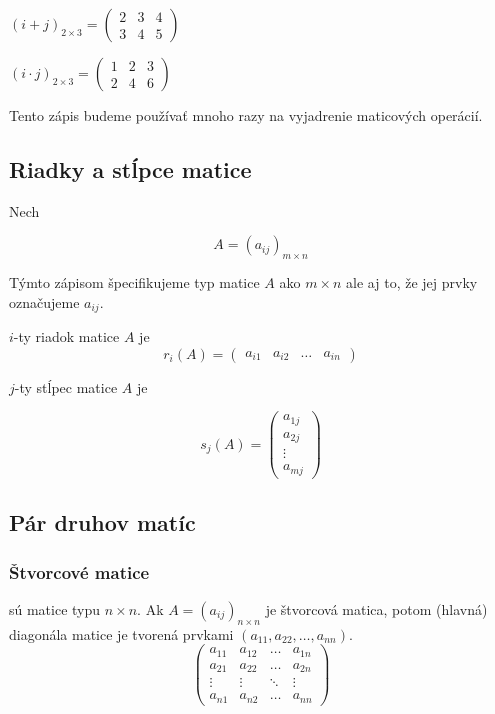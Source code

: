 \begin{example}
$(i+j)_{2 \times 3} = \begin{pmatrix} 2 & 3 & 4 \\ 3 & 4 & 5 \end{pmatrix}$
\end{example}

\begin{example}
$(i \cdot j)_{2 \times 3} = \begin{pmatrix} 1 & 2 & 3 \\ 2 & 4 & 6 \end{pmatrix}$
\end{example}

Tento zápis budeme používať mnoho razy na vyjadrenie maticových operácií.

\subsection{Riadky a stĺpce matice}
Nech

\[
A = (a_{ij})_{m \times n}
\]

Týmto zápisom špecifikujeme typ matice $A$ ako $m\times n$ ale aj to, že jej prvky označujeme $a_{ij}$.

$i$-ty riadok matice $A$ je
\[
r_i(A) = \begin{pmatrix} 
a_{i1} & a_{i2} & \dots & a_{in} 
\end{pmatrix}
\]

$j$-ty stĺpec matice $A$ je

\[s_j(A) = \begin{pmatrix} a_{1j} \\ a_{2j} \\ \vdots \\ a_{mj} \end{pmatrix}\]

\subsection{Pár druhov matíc}
\subsubsection{Štvorcové matice} 
sú matice typu $n \times n$. Ak $A = (a_{ij})_{n \times n}$ je štvorcová matica, potom (hlavná) diagonála matice je tvorená prvkami $(a_{11}, a_{22}, \dots, a_{nn})$.
\[ \begin{pmatrix} a_{11} & a_{12} & \dots & a_{1n} \\ a_{21} & a_{22} & \dots & a_{2n} \\ \vdots & \vdots & \ddots & \vdots \\ a_{n1} & a_{n2} & \dots & a_{nn} \end{pmatrix} \]


